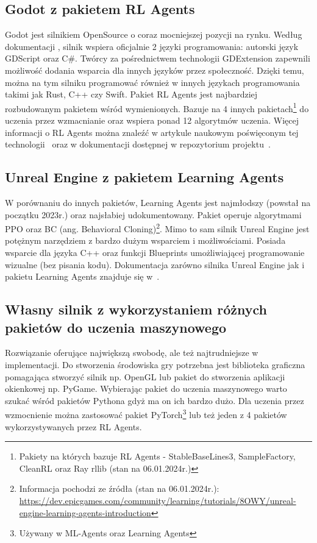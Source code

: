 \documentclass{SGGW-thesis}
\begin{document}
\subsection{Godot z pakietem RL Agents}
Godot jest silnikiem OpenSource o coraz mocniejszej pozycji na rynku. Według dokumentacji \cite{GodotDocs},
silnik wspiera oficjalnie 2 języki programowania: autorski język GDScript oraz C\#. Twórcy za pośrednictwem technologii GDExtension zapewnili możliwość dodania wsparcia dla innych języków przez społeczność.
Dzięki temu, można na tym silniku programować również w innych językach programowania takimi jak Rust, C++ czy Swift. Pakiet RL Agents jest najbardziej rozbudowanym pakietem wśród wymienionych.
Bazuje na 4 innych pakietach\footnote{Pakiety na których bazuje RL Agents - StableBaseLines3, SampleFactory, CleanRL oraz Ray rllib (stan na 06.01.2024r.)} do uczenia przez wzmacnianie
oraz wspiera ponad 12 algorytmów uczenia. Więcej informacji o RL Agents można znaleźć w artykule naukowym poświęconym tej technologii~\cite{GodotRLAgentsArticle} oraz w dokumentacji dostępnej w repozytorium projektu~\cite{GodotRLAgentsDocs}.
\subsection{Unreal Engine z pakietem Learning Agents}
W porównaniu do innych pakietów, Learning Agents jest najmłodszy (powstał na początku 2023r.) oraz najsłabiej udokumentowany. Pakiet operuje algorytmami PPO oraz BC (ang. Behavioral Cloning)\footnote{Informacja pochodzi ze źródła (stan na 06.01.2024r.): \url{https://dev.epicgames.com/community/learning/tutorials/8OWY/unreal-engine-learning-agents-introduction}}. 
Mimo to sam silnik Unreal Engine jest potężnym narzędziem z bardzo dużym wsparciem i możliwościami. Posiada wsparcie dla języka C++ oraz funkcji Blueprints umożliwiającej programowanie wizualne (bez pisania kodu). 
Dokumentacja zarówno silnika Unreal Engine jak i pakietu Learning Agents znajduje się w~\cite{UnrealDocs}.
\subsection{Własny silnik z wykorzystaniem różnych pakietów do uczenia maszynowego}
Rozwiązanie oferujące największą swobodę, ale też najtrudniejsze w implementacji. Do stworzenia środowiska gry potrzebna jest biblioteka graficzna pomagająca stworzyć silnik np. OpenGL
lub pakiet do stworzenia aplikacji okienkowej np. PyGame. Wybierając pakiet do uczenia maszynowego warto szukać wśród pakietów Pythona gdyż ma on ich bardzo dużo. Dla uczenia przez wzmocnienie można zastosować pakiet PyTorch\footnote{Używany w ML-Agents oraz Learning Agents}
lub też jeden z 4 pakietów wykorzystywanych przez RL Agents.
\end{document}
